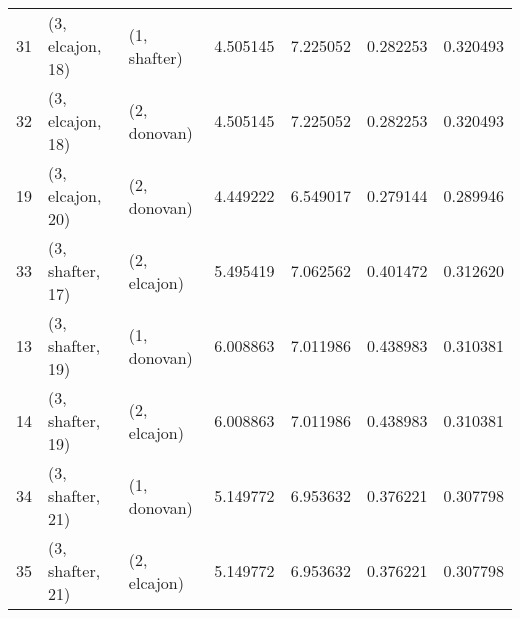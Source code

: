 \begin{tabular}{lllrrrr}
31 &  (3, elcajon, 18) &     (1, shafter) &  4.505145 &  7.225052 &   0.282253 &  0.320493 \\
32 &  (3, elcajon, 18) &     (2, donovan) &  4.505145 &  7.225052 &   0.282253 &  0.320493 \\
19 &  (3, elcajon, 20) &     (2, donovan) &  4.449222 &  6.549017 &   0.279144 &  0.289946 \\
33 &  (3, shafter, 17) &     (2, elcajon) &  5.495419 &  7.062562 &   0.401472 &  0.312620 \\
13 &  (3, shafter, 19) &     (1, donovan) &  6.008863 &  7.011986 &   0.438983 &  0.310381 \\
14 &  (3, shafter, 19) &     (2, elcajon) &  6.008863 &  7.011986 &   0.438983 &  0.310381 \\
34 &  (3, shafter, 21) &     (1, donovan) &  5.149772 &  6.953632 &   0.376221 &  0.307798 \\
35 &  (3, shafter, 21) &     (2, elcajon) &  5.149772 &  6.953632 &   0.376221 &  0.307798 \\
\bottomrule
\end{tabular}
